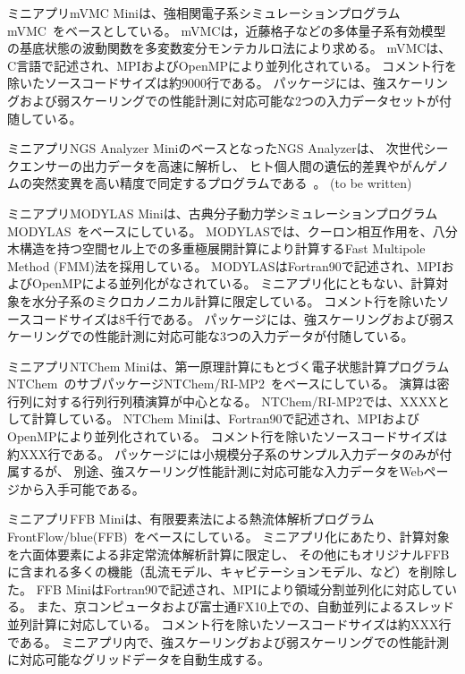 ミニアプリmVMC Miniは、強相関電子系シミュレーションプログラムmVMC~\cite{mVMC_url}\cite{mVMC_tahara2008}をベースとしている。
mVMCは，近藤格子などの多体量子系有効模型の基底状態の波動関数を多変数変分モンテカルロ法により求める。
mVMCは、C言語で記述され、MPIおよびOpenMPにより並列化されている。
コメント行を除いたソースコードサイズは約9000行である。
パッケージには、強スケーリングおよび弱スケーリングでの性能計測に対応可能な2つの入力データセットが付随している。

ミニアプリNGS Analyzer MiniのベースとなったNGS Analyzerは、
次世代シークエンサーの出力データを高速に解析し、
ヒト個人間の遺伝的差異やがんゲノムの突然変異を高い精度で同定するプログラムである~\cite{NGSA_url}。
(to be written)

ミニアプリMODYLAS Miniは、古典分子動力学シミュレーションプログラムMODYLAS~\cite{Modylas_url}\cite{Modylas_andoh2013}をベースにしている。
MODYLASでは、クーロン相互作用を、八分木構造を持つ空間セル上での多重極展開計算により計算するFast Multipole Method (FMM)法を採用している。
MODYLASはFortran90で記述され、MPIおよびOpenMPによる並列化がなされている。
ミニアプリ化にともない、計算対象を水分子系のミクロカノニカル計算に限定している。
コメント行を除いたソースコードサイズは8千行である。
パッケージには、強スケーリングおよび弱スケーリングでの性能計測に対応可能な3つの入力データが付随している。

ミニアプリNTChem Miniは、第一原理計算にもとづく電子状態計算プログラムNTChem~\cite{NTChem_url}のサブパッケージNTChem/RI-MP2~\cite{NTChem_katouda2013}をベースにしている。
演算は密行列に対する行列行列積演算が中心となる。
NTChem/RI-MP2では、XXXXとして計算している。
NTChem Miniは、Fortran90で記述され、MPIおよびOpenMPにより並列化されている。
コメント行を除いたソースコードサイズは約XXX行である。
パッケージには小規模分子系のサンプル入力データのみが付属するが、
別途、強スケーリング性能計測に対応可能な入力データをWebページから入手可能である。

ミニアプリFFB Miniは、有限要素法による熱流体解析プログラムFrontFlow/blue(FFB)~\cite{FFB_minami2012}\cite{FFB_kumahata2013}をベースにしている。
ミニアプリ化にあたり、計算対象を六面体要素による非定常流体解析計算に限定し、
その他にもオリジナルFFBに含まれる多くの機能（乱流モデル、キャビテーションモデル、など）を削除した。
FFB MiniはFortran90で記述され、MPIにより領域分割並列化に対応している。
また、京コンピュータおよび富士通FX10上での、自動並列によるスレッド並列計算に対応している。
コメント行を除いたソースコードサイズは約XXX行である。
ミニアプリ内で、強スケーリングおよび弱スケーリングでの性能計測に対応可能なグリッドデータを自動生成する。


